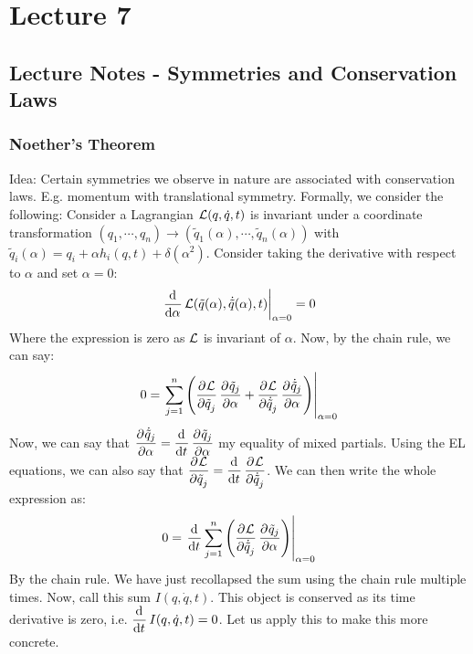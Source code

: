 \documentclass[../PHYS306Notes.tex]{subfiles}
\begin{document}
\section{Lecture 7}
\subsection{Lecture Notes - Symmetries and Conservation Laws}
\subsubsection{Noether's Theorem}
Idea: Certain symmetries we observe in nature are associated with conservation laws. E.g. momentum with translational symmetry. Formally, we consider the following:
\newline Consider a Lagrangian $\mathcal{L}(q, \dot{q}, t)$ is invariant under a coordinate transformation $(q_1, \cdots, q_n) \rightarrow (\tilde{q}_1(\alpha), \cdots, \tilde{q}_n(\alpha))$ with $\tilde{q}_i(\alpha) = q_i + \alpha h_i(q,t) + \delta(\alpha^2)$. Consider taking the derivative with respect to $\alpha$ and set $\alpha = 0$:
\[\left.\dod{}{\alpha}\LL(\tilde{q}(\alpha), \dot{\tilde{q}}(\alpha), t)\right|_{\alpha = 0} = 0\]
Where the expression is zero as $\mathcal{L}$ is invariant of $\alpha$. Now, by the chain rule, we can say:
\[0 = \left. \sum_{j=1}^n\left(\dpd{\LL}{\tilde{q}_j}\dpd{\tilde{q}_j}{\alpha} + \dpd{\LL}{\dot{\tilde{q}}_j}\dpd{\dot{\tilde{q}}_j}{\alpha}\right)\right|_{\alpha=0}\]
Now, we can say that $\dpd{\dot{\tilde{q}}_j}{\alpha} = \dod{}{t}\dpd{\tilde{q}_j}{\alpha}$ my equality of mixed partials. Using the EL equations, we can also say that $\dpd{\LL}{\tilde{q}_j} = \dod{}{t}\dpd{\LL}{\dot{\tilde{q}}_j}$. We can then write the whole expression as:
\[0 = \left.\dod{}{t}\sum_{j=1}^n\left(\dpd{\LL}{\dot{\tilde{q}}_j}\dpd{\tilde{q}_j}{\alpha}\right)\right|_{\alpha=0}\]
By the chain rule. We have just recollapsed the sum using the chain rule multiple times. Now, call this sum $I(q, \dot{q}, t)$. This object is conserved as its time derivative is zero, i.e. $\dod{}{t}I(q, \dot{q}, t) = 0$. Let us apply this to make this more concrete. 
\end{document}
